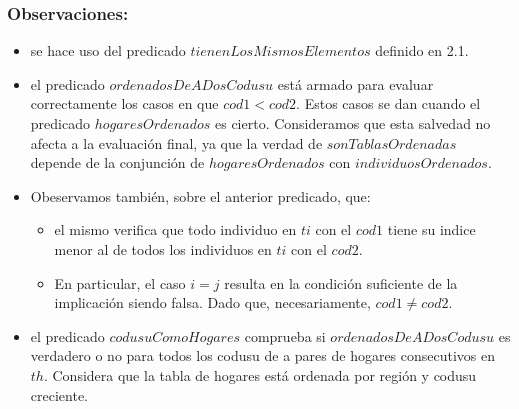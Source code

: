     \subsubsection{Observaciones:}
        \begin{itemize}
            \item se hace uso del predicado $tienenLosMismosElementos$ definido en 2.1.
            
            \item el predicado $ordenadosDeADosCodusu$ está armado para evaluar correctamente los casos en que $cod1 < cod2$. Estos
            casos se dan cuando el predicado $hogaresOrdenados$ es cierto.  
            Consideramos que esta salvedad no afecta a la evaluación final,
            ya que la verdad de $sonTablasOrdenadas$ depende de la conjunción de $hogaresOrdenados$ con $individuosOrdenados$. 
            \item Obeservamos también, sobre el anterior predicado, que:
                \begin{itemize}
                    \item el mismo verifica que todo individuo en $ti$ con el $cod1$ tiene 
                    su indice menor al de todos los individuos en $ti$ con el $cod2$.
                    \item En particular, el caso $i = j$ resulta en la condición suficiente de la implicación siendo falsa. 
                    Dado que, necesariamente, $cod1 \neq cod2$.
                \end{itemize}

            \item el predicado $codusuComoHogares$ comprueba si $ordenadosDeADosCodusu$ es verdadero o no para todos los 
            codusu de a pares de hogares consecutivos en $th$. Considera que la tabla de hogares está ordenada por regi\'on 
            y codusu creciente.
            

\end{itemize}
